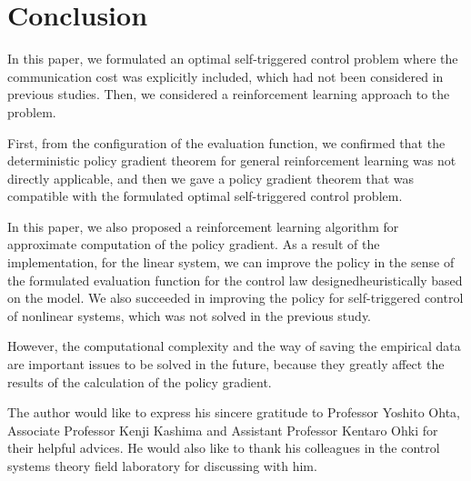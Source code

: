 \documentclass[english, dvipdfmx]{ampmt}             %
\begin{document}
\section{Conclusion}
In this paper, we formulated an optimal self-triggered control problem where the communication cost was explicitly included, which had not been considered in previous studies. Then, we considered a reinforcement learning approach to the problem.  \par
First, from the configuration of the evaluation function, we confirmed that the deterministic policy gradient theorem for general reinforcement learning was not directly applicable, and then we gave a policy gradient theorem that was compatible with the formulated optimal self-triggered control problem. \par
In this paper, we also proposed a reinforcement learning algorithm for approximate computation of the policy gradient. As a result of the implementation, for the linear system, we can improve the policy in the sense of the formulated evaluation function for the control law designedheuristically based on  the model. We also succeeded in improving the policy for self-triggered control of nonlinear systems, which was not solved in the previous study. \par
However, the computational complexity and the way of saving the empirical data are important issues to be solved in the future, because they greatly affect the results of the calculation of the policy gradient.

\acknowledgment
The author would like to express his sincere gratitude to Professor
Yoshito Ohta, Associate Professor Kenji Kashima and Assistant Professor Kentaro Ohki for their helpful advices. He would also like to thank his colleagues in the control systems theory field laboratory for discussing with him.
\end{document}

